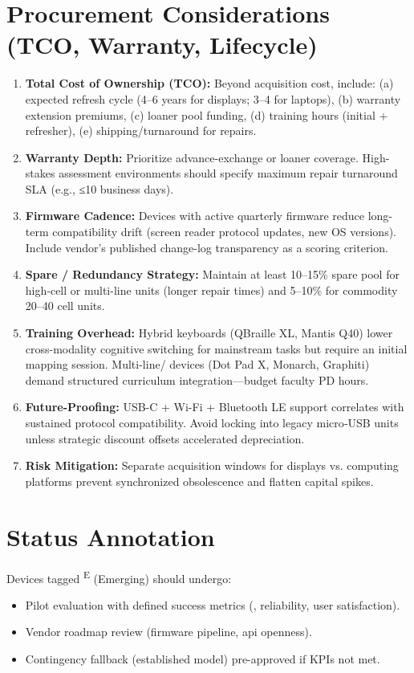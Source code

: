 \normalsize

\section*{Procurement Considerations (TCO, Warranty, Lifecycle)}
\begin{enumerate}
	\item \textbf{Total Cost of Ownership (TCO):} Beyond acquisition cost, include: (a) expected refresh cycle (4–6 years for displays; 3–4 for laptops), (b) warranty extension premiums, (c) loaner pool funding, (d) training hours (initial + refresher), (e) shipping/turnaround for repairs.
	\item \textbf{Warranty Depth:} Prioritize advance-exchange or loaner coverage. High-stakes assessment environments should specify maximum repair turnaround SLA (e.g., ≤10 business days).
	\item \textbf{Firmware Cadence:} Devices with active quarterly firmware reduce long-term compatibility drift (screen reader protocol updates, new OS versions). Include vendor’s published change-log transparency as a scoring criterion.
	\item \textbf{Spare / Redundancy Strategy:} Maintain at least 10–15\% spare pool for high‑cell or multi-line units (longer repair times) and 5–10\% for commodity 20–40 cell units.
	\item \textbf{Training Overhead:} Hybrid keyboards (QBraille XL, Mantis Q40) lower cross-modality cognitive switching for mainstream tasks but require an initial mapping session. Multi-line/ devices (Dot Pad X, Monarch, Graphiti) demand structured curriculum integration—budget faculty PD hours.
	\item \textbf{Future-Proofing:} USB-C + Wi-Fi + Bluetooth LE support correlates with sustained protocol compatibility. Avoid locking into legacy micro‑USB units unless strategic discount offsets accelerated depreciation.
	\item \textbf{Risk Mitigation:} Separate acquisition windows for displays vs. computing platforms prevent synchronized obsolescence and flatten capital spikes.
\end{enumerate}

\section*{Status Annotation}
Devices tagged \textsuperscript{E} (Emerging) should undergo:
\begin{itemize}
	\item Pilot evaluation with defined success metrics (, reliability, user satisfaction).
	\item Vendor roadmap review (firmware pipeline, \gls{api} openness).
	\item Contingency fallback (established model) pre-approved if KPIs not met.
\end{itemize}

